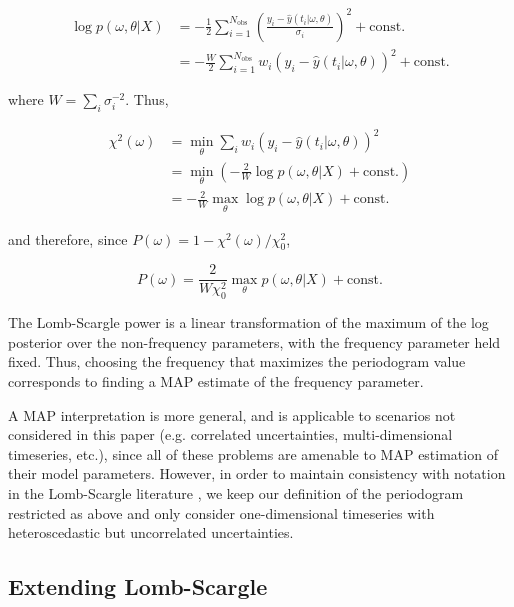 \documentclass[apj]{emulateapj}
\begin{document}
\begin{align}
    \log p(\omega, \theta|X) &= -\frac{1}{2}\sum_{i=1}^{N_{\mathrm{obs}}}\left(\frac{y_i - \hat{y}(t_i | \omega, \theta)}{\sigma_i}\right)^2 + \mathrm{const.}\\
                             &= -\frac{W}{2}\sum_{i=1}^{N_{\mathrm{obs}}}w_i (y_i - \hat{y}(t_i | \omega, \theta))^2 + \mathrm{const.}
\end{align}

where $W= \sum_i \sigma_i^{-2}$. Thus, 

\begin{align}
    \chi^2(\omega) &= \min_{\theta} \sum_i w_i (y_i - \hat{y}(t_i|\omega, \theta))^2\\
                   &= \min_{\theta}\left(-\frac{2}{W}\log p(\omega, \theta|X) + \mathrm{const.}\right)\\
                   &= -\frac{2}{W}\max_\theta \log p(\omega, \theta|X) + \mathrm{const.}
\end{align}

and therefore, since $P(\omega) = 1 - \chi^2(\omega) / \chi_0^2$,

\begin{equation}
\label{eq:lsismap}
    P(\omega) = \frac{2}{W\chi_0^2} \max_\theta p(\omega, \theta|X) + \mathrm{const.}
\end{equation}

The Lomb-Scargle power is a linear transformation of the maximum of the log posterior over the non-frequency parameters, with the frequency parameter held fixed. Thus, choosing the frequency that maximizes the periodogram value corresponds to finding a MAP estimate of the frequency parameter.

A MAP interpretation is more general, and is applicable to scenarios not considered in this paper (e.g. correlated uncertainties, multi-dimensional timeseries, etc.), since all of these problems are amenable to MAP estimation of their model parameters. However, in order to maintain consistency with notation in the Lomb-Scargle literature \citep[e.g.][]{Zechmeister+Kurster_2009,Vanderplas_2018}, we keep our definition of the periodogram restricted as above and only consider one-dimensional timeseries with heteroscedastic but uncorrelated uncertainties.

\subsection{Extending Lomb-Scargle}
\end{document}
